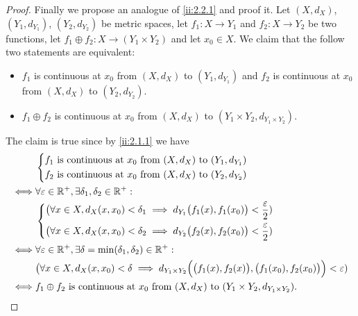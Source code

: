 \begin{proof}
  Finally we propose an analogue of \cref{ii:2.2.1} and proof it.
  Let \((X, d_X)\), \((Y_1, d_{Y_1})\), \((Y_2, d_{Y_2})\) be metric spaces, let \(f_1 : X \to Y_1\) and \(f_2 : X \to Y_2\) be two functions, let \(f_1 \oplus f_2 : X \to (Y_1 \times Y_2)\) and let \(x_0 \in X\).
  We claim that the follow two statements are equivalent:
  \begin{itemize}
    \item \(f_1\) is continuous at \(x_0\) from \((X, d_X)\) to \((Y_1, d_{Y_1})\) and \(f_2\) is continuous at \(x_0\) from \((X, d_X)\) to \((Y_2, d_{Y_2})\).
    \item \(f_1 \oplus f_2\) is continuous at \(x_0\) from \((X, d_X)\) to \((Y_1 \times Y_2, d_{Y_1 \times Y_2})\).
  \end{itemize}
  The claim is true since by \cref{ii:2.1.1} we have
  \begin{align*}
         & \begin{dcases}
             f_1 \text{ is continuous at } x_0 \text{ from } (X, d_X) \text{ to } (Y_1, d_{Y_1}) \\
             f_2 \text{ is continuous at } x_0 \text{ from } (X, d_X) \text{ to } (Y_2, d_{Y_2})
           \end{dcases}                                                                   \\
    \iff & \forall \varepsilon \in \mathbb{R}^+, \exists \delta_1, \delta_2 \in \mathbb{R}^+ :                                                                                   \\
         & \begin{dcases}
             \big(\forall x \in X, d_X(x, x_0) < \delta_1 \implies d_{Y_1}\big(f_1(x), f_1(x_0)\big) < \dfrac{\varepsilon}{2}) \\
             \big(\forall x \in X, d_X(x, x_0) < \delta_2 \implies d_{Y_2}\big(f_2(x), f_2(x_0)\big) < \dfrac{\varepsilon}{2})
           \end{dcases}                                     \\
    \iff & \forall \varepsilon \in \mathbb{R}^+, \exists \delta = \min(\delta_1, \delta_2) \in \mathbb{R}^+ :                                                                    \\
         & \big(\forall x \in X, d_X(x, x_0) < \delta \implies d_{Y_1 \times Y_2}\Big(\big(f_1(x), f_2(x)\big), \big(f_1(x_0), f_2(x_0)\big)\Big) < \varepsilon) \\
    \iff & f_1 \oplus f_2 \text{ is continuous at } x_0 \text{ from } (X, d_X) \text{ to } (Y_1 \times Y_2, d_{Y_1 \times Y_2}).
  \end{align*}
\end{proof}

